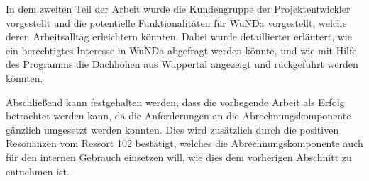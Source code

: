 In dem zweiten Teil der Arbeit wurde die Kundengruppe der Projektentwickler vorgestellt und die potentielle Funktionalitäten für \ac{WuNDa} vorgestellt, welche deren Arbeitsalltag erleichtern könnten.
Dabei wurde detaillierter erläutert, wie ein berechtigtes Interesse in \ac{WuNDa} abgefragt werden könnte, und wie mit Hilfe des Programms die Dachhöhen aus Wuppertal angezeigt und rückgeführt werden könnten.

Abschließend kann festgehalten werden, dass die vorliegende Arbeit als Erfolg betrachtet werden kann, da die Anforderungen an die Abrechnungskomponente gänzlich umgesetzt werden konnten.
Dies wird zusätzlich durch die positiven Resonanzen vom Ressort 102 bestätigt, welches die Abrechnungskomponente auch für den internen Gebrauch einsetzen will, wie dies dem vorherigen Abschnitt zu entnehmen ist.










